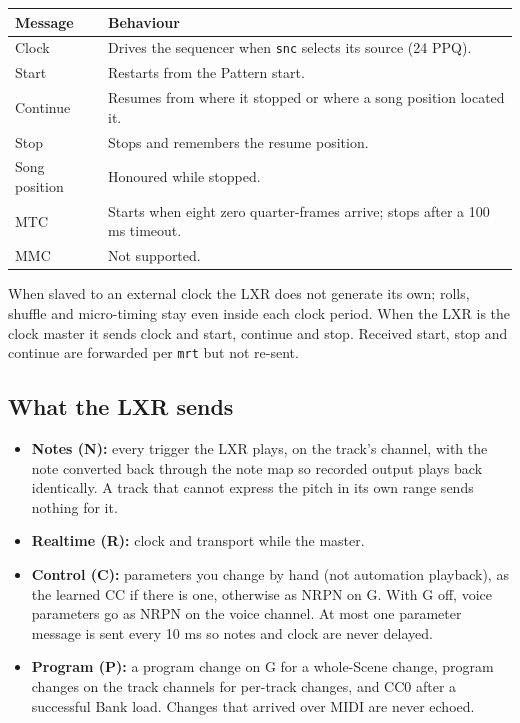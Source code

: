 {\def\LTcaptype{none} %
\begin{longtable}[]{@{}
  >{\raggedright\arraybackslash}p{}
  >{\raggedright\arraybackslash}p{}@{}}
\toprule\noalign{}
\begin{minipage}[b]{\linewidth}\raggedright
Message
\end{minipage} & \begin{minipage}[b]{\linewidth}\raggedright
Behaviour
\end{minipage} \\
\midrule\noalign{}
\endhead
\bottomrule\noalign{}
\endlastfoot
Clock & Drives the sequencer when \texttt{snc} selects its source (24
PPQ). \\
Start & Restarts from the Pattern start. \\
Continue & Resumes from where it stopped or where a song position
located it. \\
Stop & Stops and remembers the resume position. \\
Song position & Honoured while stopped. \\
MTC & Starts when eight zero quarter-frames arrive; stops after a 100 ms
timeout. \\
MMC & Not supported. \\
\end{longtable}
}

When slaved to an external clock the LXR does not generate its own;
rolls, shuffle and micro-timing stay even inside each clock period. When
the LXR is the clock master it sends clock and start, continue and stop.
Received start, stop and continue are forwarded per \texttt{mrt} but not
re-sent.

\subsection{What the LXR sends}\label{what-the-lxr-sends}

\begin{itemize}
\tightlist
\item
  \textbf{Notes (N):} every trigger the LXR plays, on the track's
  channel, with the note converted back through the note map so recorded
  output plays back identically. A track that cannot express the pitch
  in its own range sends nothing for it.
\item
  \textbf{Realtime (R):} clock and transport while the master.
\item
  \textbf{Control (C):} parameters you change by hand (not automation
  playback), as the learned CC if there is one, otherwise as NRPN on G.
  With G off, voice parameters go as NRPN on the voice channel. At most
  one parameter message is sent every 10 ms so notes and clock are never
  delayed.
\item
  \textbf{Program (P):} a program change on G for a whole-Scene change,
  program changes on the track channels for per-track changes, and CC0
  after a successful Bank load. Changes that arrived over MIDI are never
  echoed.
\end{itemize}

